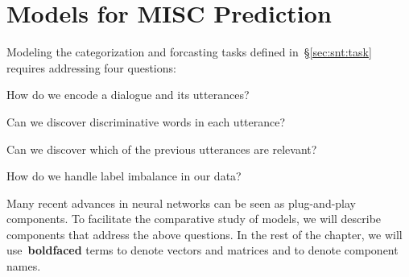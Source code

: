 \section{Models for MISC Prediction}
\label{sec:snt:devices}

Modeling the categorization and forcasting tasks defined in~\S\ref{sec:snt:task} requires
addressing four questions:
\begin{inparaenum}[(1)]
\item How do we encode a dialogue and its utterances?
\item Can we discover discriminative words in each utterance?
\item Can we discover which of the previous utterances are relevant?
\item How do we handle label imbalance in our data?
\end{inparaenum}
%
Many recent advances in neural networks can be seen as plug-and-play
components. To facilitate the comparative study of models, we will
describe components that address the above questions.  %
%
In the rest of the chapter, we will use~\textbf{boldfaced} terms to
denote vectors and matrices and  to denote
component names.

%

